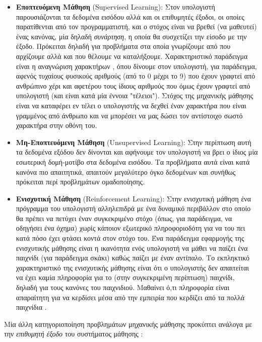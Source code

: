\documentclass[11pt]{article} %
\numberwithin{equation}{subsection}
\begin{document}
\begin{itemize}
\item \textbf{Εποπτευόμενη Μάθηση} (Supervised Learning): Στον υπολογιστή παρουσιάζονται τα δεδομένα εισόδου αλλά και οι επιθυμητές έξοδοι, οι οποίες παρατίθενται από τον προγραμματιστή, και ο στόχος είναι να βρεθεί (να μαθευτεί) ένας κανόνας, μία δηλαδή \textit{συνάρτηση}, η οποία θα συσχετίζει την είσοδο με την έξοδο. Πρόκειται δηλαδή για προβλήματα στα οποία γνωρίζουμε από που αρχίζουμε αλλά και που θέλουμε να καταλήξουμε. Χαρακτηριστικό παράδειγμα είναι η αναγνώριση χαρακτήρων \cite{neuralnets3}, όπου δίνουμε στον υπολογιστή, για παράδειγμα, αφενός τυχαίους φυσικούς αριθμούς (από το 0 μέχρι το 9) που έχουν γραφτεί από ανθρώπινο χέρι και αφετέρου τους ίδιους αριθμούς που όμως έχουν γραφτεί από υπολογιστή (και είναι κατά μία έννοια "τέλειοι"). Στόχος της μηχανικής μάθησης είναι να καταφέρει εν τέλει ο υπολογιστής να δεχθεί έναν χαρακτήρα που είναι γραμμένος από άνθρωπο και να μπορέσει να μας δώσει τον αντίστοιχο σωστό χαρακτήρα στην οθόνη του. \\
\item \textbf{Μη-Εποπτευόμενη Μάθηση} (Unsupervised Learning): Στην περίπτωση αυτή τα δεδομένα εξόδου δεν δίνονται και αφήνουμε τον υπολογιστή να βρει ο ίδιος μία εσωτερική δομή-μοτίβο στα δεδομένα εισόδου. Τα προβλήματα αυτά είναι κατά κανόνα πιο απαιτητικά, απαιτούν μεγαλύτερο όγκο δεδομένων και συνήθως πρόκειται περί προβλημάτων ομαδοποίησης.\\
\item \textbf{Ενισχυτική Μάθηση} (Reinforcement Learning): Στην ενισχυτική μάθηση ένα πρόγραμμα του υπολογιστή αλληλεπιδρά με ένα δυναμικό περιβάλλον στο οποίο θα πρέπει να πετύχει έναν συγκεκριμένο στόχο (όπως, για παράδειγμα, να οδηγήσει ένα όχημα) χωρίς κάποιον εξωτερικό πληροφοριοδότη για να του πει κατά πόσο έχει φτάσει κοντά στον στόχο του. Ένα παράδειγμα εφαρμογής της ενισχυτικής μάθησης είναι η ικανότητα ενός υπολογιστή να μάθει να παίζει ένα παιχνίδι (για παράδειγμα σκάκι) καθώς παίζει με έναν αντίπαλο. Το εκπληκτικό χαρακτηριστικό της ενισχυτικής μάθησης είναι ότι ο υπολογιστής δεν απαιτείται να έχει καμία πληροφορία για το (στην συγκεκριμένη περίπτωση) παιχνίδι, δηλαδή για τους κανόνες του παιχνιδιού. Μαθαίνει ό,τι πληροφορία είναι απαραίτητη για να κερδίσει μέσα από την εμπειρία που κερδίζει από τα πολλά παιχνίδια \cite{reinflearning}.
\end{itemize}

Μία άλλη κατηγοριοποίηση προβλημάτων μηχανικής μάθησης προκύπτει ανάλογα με την \textit{επιθυμητή έξοδο} του συστήματος μάθησης \cite{machinelearning2}:\\
\end{document}
